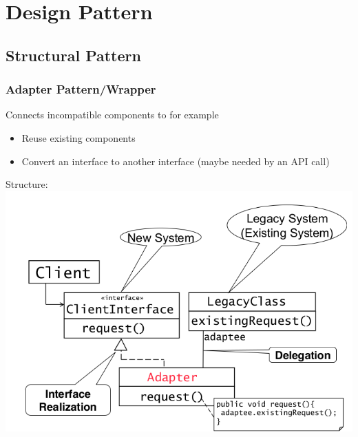 
\section{Design Pattern}


\subsection{Structural Pattern}

\subsubsection{Adapter Pattern/Wrapper}
Connects incompatible components to for example
\begin{itemize}
  \item Reuse existing components
  \item Convert an interface to another interface (maybe needed by an API call)
\end{itemize}

Structure:\\
\includegraphics[width=\linewidth]{design_pattern/adapter.png}


